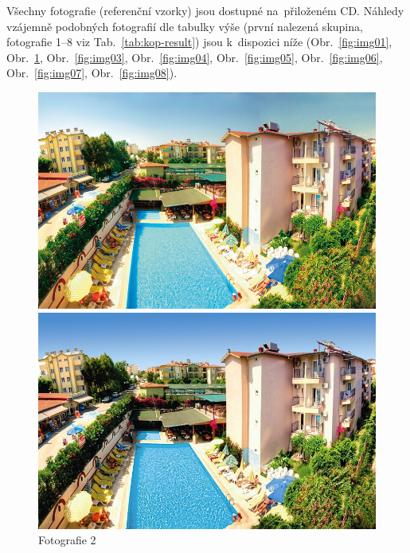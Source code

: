 
Všechny fotografie (referenční vzorky) jsou dostupné na~přiloženém CD. Náhledy vzájemně podobných fotografií dle tabulky výše (první nalezená skupina, fotografie 1--8 viz Tab.~\ref{tab:kop-result}) jsou k~dispozici níže (Obr.~\ref{fig:img01}, Obr.~\ref{fig:img02}, Obr.~\ref{fig:img03}, Obr.~\ref{fig:img04}, Obr.~\ref{fig:img05}, Obr.~\ref{fig:img06}, Obr.~\ref{fig:img07}, Obr.~\ref{fig:img08}).

\begin{figure}[!htb]
	\includegraphics[width=\linewidth]{graphics/kop/aa01.png}
	\caption{Fotografie 1}\label{fig:img01}
	\endminipage\hfill
	\includegraphics[width=\linewidth]{graphics/kop/aa02.png}
	\caption{Fotografie 2}\label{fig:img02}
	\endminipage\hfill

\end{figure}
